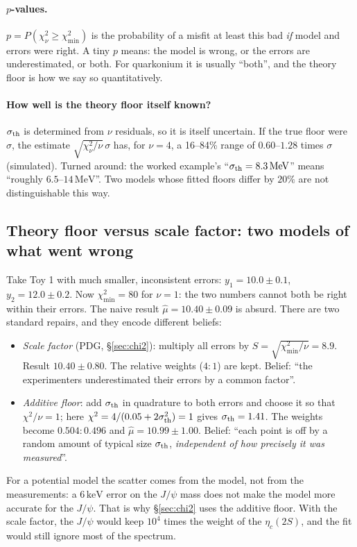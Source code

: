 \documentclass[11pt,a4paper]{article}
\numberwithin{equation}{section}
\theoremstyle{definition}
\theoremstyle{plain}
\theoremstyle{remark}
\numberwithin{algorithm}{section}
\newcommand{\MeV}{\,\mathrm{MeV}}
\newcommand{\keV}{\,\mathrm{keV}}
\begin{document}
\paragraph{$p$-values.} $p=P(\chi^2_\nu\ge\chi^2_{\min})$ is the probability of a misfit at least this bad \emph{if} model and errors were right. A tiny $p$ means: the model is wrong, or the errors are underestimated, or both. For quarkonium it is usually ``both'', and the theory floor is how we say so quantitatively.

\paragraph{How well is the theory floor itself known?} $\sigma_{\rm th}$ is determined from $\nu$ residuals, so it is itself uncertain. If the true floor were $\sigma$, the estimate $\sqrt{\chi^2_\nu/\nu}\,\sigma$ has, for $\nu=4$, a 16--84\% range of $0.60$--$1.28$ times $\sigma$ (simulated). Turned around: the worked example's ``$\sigma_{\rm th}=8.3\MeV$'' means ``roughly $6.5$--$14\MeV$''. Two models whose fitted floors differ by $20\%$ are not distinguishable this way.

\subsection{Theory floor versus scale factor: two models of what went wrong}\label{sec:pr-floor}
Take Toy 1 with much smaller, inconsistent errors: $y_1=10.0\pm0.1$, $y_2=12.0\pm0.2$. Now $\chi^2_{\min}=80$ for $\nu=1$: the two numbers cannot both be right within their errors. The naive result $\hat\mu=10.40\pm0.09$ is absurd. There are two standard repairs, and they encode different beliefs:
\begin{itemize}[leftmargin=1.3em,itemsep=3pt]
\item \emph{Scale factor} (PDG, \S\ref{sec:chi2}): multiply all errors by $S=\sqrt{\chi^2_{\min}/\nu}=8.9$. Result $10.40\pm0.80$. The relative weights ($4:1$) are kept. Belief: ``the experimenters underestimated their errors by a common factor''.
\item \emph{Additive floor}: add $\sigma_{\rm th}$ in quadrature to both errors and choose it so that $\chi^2/\nu=1$; here $\chi^2=4/(0.05+2\sigma_{\rm th}^2)=1$ gives $\sigma_{\rm th}=1.41$. The weights become $0.504:0.496$ and $\hat\mu=10.99\pm1.00$. Belief: ``each point is off by a random amount of typical size $\sigma_{\rm th}$, \emph{independent of how precisely it was measured}''.
\end{itemize}
For a potential model the scatter comes from the model, not from the measurements: a $6\keV$ error on the $J/\psi$ mass does not make the model more accurate for the $J/\psi$. That is why \S\ref{sec:chi2} uses the additive floor. With the scale factor, the $J/\psi$ would keep $10^4$ times the weight of the $\eta_c(2S)$, and the fit would still ignore most of the spectrum.
\end{document}
